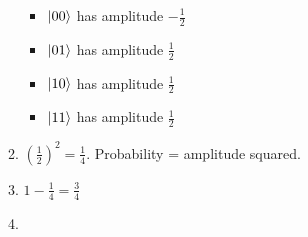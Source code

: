 \documentclass[12pt]{article}
\begin{document}
\begin{enumerate}[font=\bfseries]
\begin{enumerate}
    \begin{itemize}
        \item $\ket{00}$ has amplitude $-\frac{1}{2}$
        \item $\ket{01}$ has amplitude $\frac{1}{2}$
        \item $\ket{10}$ has amplitude $\frac{1}{2}$
        \item $\ket{11}$ has amplitude $\frac{1}{2}$
    \end{itemize}
    \item $(\frac{1}{2})^2 = \frac{1}{4}$. Probability = amplitude squared. 
    \item $1 - \frac{1}{4} = \frac{3}{4}$
    \item 
    \end{enumerate}
\end{enumerate}
\end{document}
